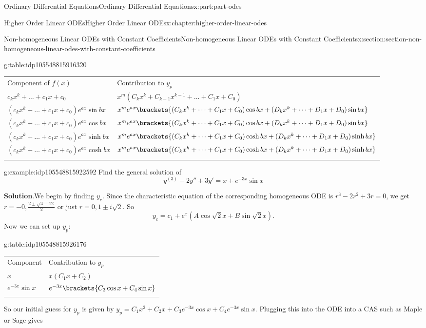 \documentclass[twoside,10pt,]{book}
\newcommand{\blocktitlefont}{\relax}
\newcommand{\tabularfont}{\relax}
\numberwithin{equation}{part}
\newcommand{\hrulethick} {\noalign{\hrule height 0.11em}}
\begin{document}
\begin{partptx}{Ordinary Differential Equations}{}{Ordinary Differential Equations}{}{}{x:part:part-odes}
\begin{chapterptx}{Higher Order Linear ODEs}{}{Higher Order Linear ODEs}{}{}{x:chapter:higher-order-linear-odes}
\begin{sectionptx}{Non-homogeneous Linear ODEs with Constant Coefficients}{}{Non-homogeneous Linear ODEs with Constant Coefficients}{}{}{x:section:section-non-homogeneous-linear-odes-with-constant-coefficients}
\begin{tableptx}{\textbf{}}{g:table:idp105548815916320}{}
\centering%
{\tabularfont%
\begin{tabular}{ll}\hrulethick
Component of \(f(x)\)&Contribution to \(y_{p}\)\tabularnewline\hrulethick
\(c_{k}x^{k}+\dots+c_{1}x+c_{0}\)&\(x^{m}(C_{k}x^{k}+C_{k-1}x^{k-1}+\dots+C_{1}x+C_{0})\)\tabularnewline[0pt]
\((c_{k}x^{k}+\dots+c_{1}x+c_{0})e^{ax}\sin bx\)&\(x^{m}e^{ax}\brackets{(C_{k}x^{k}+\dots+C_{1}x+C_{0})\cos bx+(D_{k}x^{k}+\dots+D_{1}x+D_{0})\sin bx}\)\tabularnewline[0pt]
\((c_{k}x^{k}+\dots+c_{1}x+c_{0})e^{ax}\cos bx\)&\(x^{m}e^{ax}\brackets{(C_{k}x^{k}+\dots+C_{1}x+C_{0})\cos bx+(D_{k}x^{k}+\dots+D_{1}x+D_{0})\sin bx}\)\tabularnewline[0pt]
\((c_{k}x^{k}+\dots+c_{1}x+c_{0})e^{ax}\sinh bx\)&\(x^{m}e^{ax}\brackets{(C_{k}x^{k}+\dots+C_{1}x+C_{0})\cosh bx+(D_{k}x^{k}+\dots+D_{1}x+D_{0})\sinh bx}\)\tabularnewline[0pt]
\((c_{k}x^{k}+\dots+c_{1}x+c_{0})e^{ax}\cosh bx\)&\(x^{m}e^{ax}\brackets{(C_{k}x^{k}+\dots+C_{1}x+C_{0})\cosh bx+(D_{k}x^{k}+\dots+D_{1}x+D_{0})\sinh bx}\)\tabularnewline\hrulethick
\end{tabular}
}%
\end{tableptx}%
\begin{example}{}{g:example:idp105548815922592}%
Find the general solution of%
\begin{equation*}
y^{(3)}-2y''+3y'= x+e^{-3x}\sin x
\end{equation*}
%
\par\smallskip%
\noindent\textbf{\blocktitlefont Solution}.\hypertarget{g:solution:idp105548815923488}{}\quad{}We begin by finding \(y_{c}\). Since the characteristic equation of the corresponding homogeneous ODE is \(r^{3}-2r^{2}+3r=0\), we get \(r=-0,\frac{2\pm\sqrt{4-12}}{2}\) or just \(r=0,1\pm i\sqrt{2}\). So%
\begin{equation*}
y_{c} = c_{1}+e^{x}(A\cos\sqrt{2}x+B\sin\sqrt{2}x).
\end{equation*}
Now we can set up \(y_{p}\):%
\begin{tableptx}{\textbf{}}{g:table:idp105548815926176}{}%
\centering%
{\tabularfont%
\begin{tabular}{ll}\hrulethick
Component&Contribution to \(y_{p}\)\tabularnewline\hrulethick
\(x\)&\(x(C_{1}x+C_{2})\)\tabularnewline[0pt]
\(e^{-3x}\sin x\)&\(e^{-3x}\brackets{C_{3}\cos x+C_{4}\sin x}\)\tabularnewline\hrulethick
\end{tabular}
}%
\end{tableptx}%
So our initial guess for \(y_{p}\) is given by \(y_{p} = C_{1}x^{2}+C_{2}x+C_{3}e^{-3x}\cos x+C_{4}e^{-3x}\sin x\). Plugging this into the ODE into a CAS such as Maple or Sage gives%

\end{example}
\end{sectionptx}
\end{chapterptx}
\end{partptx}
\end{document}
